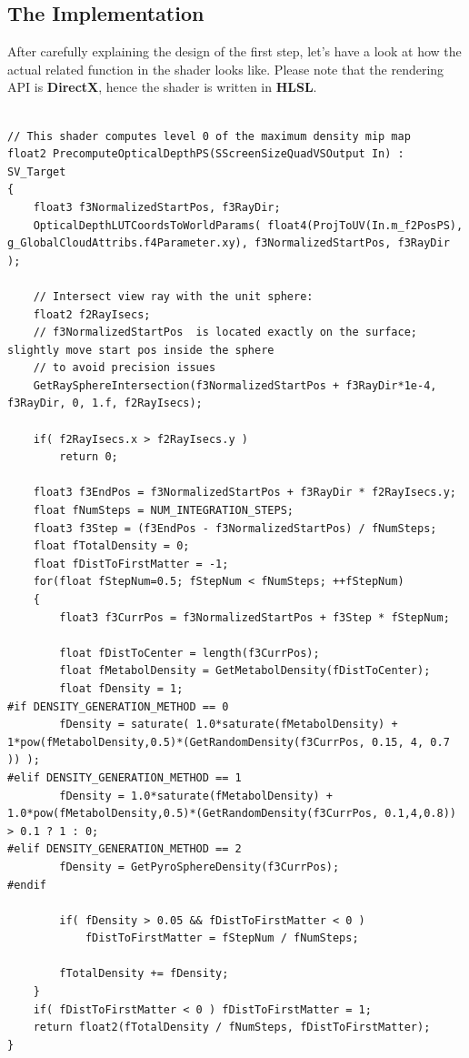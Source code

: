 \subsection{The Implementation}
After carefully explaining the design of the first step, let's have a look at how the actual related function in the shader looks like. Please note that the rendering API is \textbf{DirectX}, hence the shader is written in \textbf{HLSL}.\\\\
\begin{lstlisting}
// This shader computes level 0 of the maximum density mip map
float2 PrecomputeOpticalDepthPS(SScreenSizeQuadVSOutput In) : SV_Target
{
    float3 f3NormalizedStartPos, f3RayDir;
    OpticalDepthLUTCoordsToWorldParams( float4(ProjToUV(In.m_f2PosPS), g_GlobalCloudAttribs.f4Parameter.xy), f3NormalizedStartPos, f3RayDir );
    
    // Intersect view ray with the unit sphere:
    float2 f2RayIsecs;
    // f3NormalizedStartPos  is located exactly on the surface; slightly move start pos inside the sphere
    // to avoid precision issues
    GetRaySphereIntersection(f3NormalizedStartPos + f3RayDir*1e-4, f3RayDir, 0, 1.f, f2RayIsecs);
    
    if( f2RayIsecs.x > f2RayIsecs.y )
        return 0;

    float3 f3EndPos = f3NormalizedStartPos + f3RayDir * f2RayIsecs.y;
    float fNumSteps = NUM_INTEGRATION_STEPS;
    float3 f3Step = (f3EndPos - f3NormalizedStartPos) / fNumSteps;
    float fTotalDensity = 0;
    float fDistToFirstMatter = -1;
    for(float fStepNum=0.5; fStepNum < fNumSteps; ++fStepNum)
    {
        float3 f3CurrPos = f3NormalizedStartPos + f3Step * fStepNum;
        
        float fDistToCenter = length(f3CurrPos);
        float fMetabolDensity = GetMetabolDensity(fDistToCenter);
        float fDensity = 1;
#if DENSITY_GENERATION_METHOD == 0
        fDensity = saturate( 1.0*saturate(fMetabolDensity) + 1*pow(fMetabolDensity,0.5)*(GetRandomDensity(f3CurrPos, 0.15, 4, 0.7 )) );
#elif DENSITY_GENERATION_METHOD == 1
        fDensity = 1.0*saturate(fMetabolDensity) + 1.0*pow(fMetabolDensity,0.5)*(GetRandomDensity(f3CurrPos, 0.1,4,0.8)) > 0.1 ? 1 : 0;
#elif DENSITY_GENERATION_METHOD == 2
        fDensity = GetPyroSphereDensity(f3CurrPos);
#endif

        if( fDensity > 0.05 && fDistToFirstMatter < 0 )
            fDistToFirstMatter = fStepNum / fNumSteps;
       
        fTotalDensity += fDensity;
    }
    if( fDistToFirstMatter < 0 ) fDistToFirstMatter = 1;
    return float2(fTotalDensity / fNumSteps, fDistToFirstMatter);
}
\end{lstlisting}

